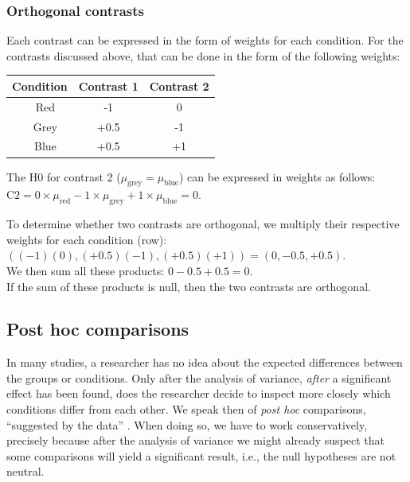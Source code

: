 \documentclass[
]{book}
\begin{document}
\subsubsection{Orthogonal contrasts}\label{orthogonal-contrasts}

Each contrast can be expressed in the form of weights for each
condition. For the contrasts discussed above, that can be done
in the form of the following weights:

\begin{longtable}[]{@{}ccc@{}}
\toprule\noalign{}
Condition & Contrast 1 & Contrast 2 \\
\midrule\noalign{}
\endhead
\bottomrule\noalign{}
\endlastfoot
~~Red & -1 & 0 \\
~~Grey & +0.5 & -1 \\
~~Blue & +0.5 & +1 \\
\end{longtable}

The H0 for contrast 2 (\(\mu_\textrm{grey} = \mu_\textrm{blue}\)) can be
expressed in weights as follows:
\(\textrm{C2} = 0\times \mu_\textrm{red} -1 \times \mu_\textrm{grey} +1 \times \mu_\textrm{blue} = 0\).

To determine whether two contrasts are orthogonal, we multiply
their respective weights for each condition (row):\\
\(( (-1)(0), (+0.5)(-1), (+0.5)(+1) )= (0, -0.5, +0.5)\).\\
We then sum all these products:
\(0 -0.5 + 0.5 = 0\).\\
If the sum of these products is null, then the two
contrasts are orthogonal.

\subsection{Post hoc comparisons}\label{sec:anova-oneway-posthoc}

In many studies, a researcher has no idea about the expected differences
between the groups or conditions. Only after the analysis of variance,
\emph{after} a significant effect has been found, does the researcher decide
to inspect more closely which conditions differ from each other. We speak
then of \emph{post hoc} comparisons, ``suggested by the data'' \citep[ p.200]{MD04}.
When doing so, we have to work conservatively, precisely because
after the analysis of variance we might already suspect that some
comparisons will yield a significant result,
i.e., the null hypotheses are not neutral.
\end{document}
